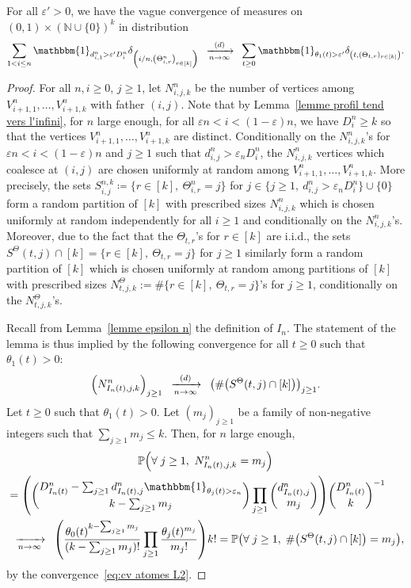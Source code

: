 \documentclass[AHL,Unicode,published]{cedram}
\newcommand{\e}{\varepsilon}
\newcommand{\cv}[1][n]{\enskip\xrightarrow[#1 \to \infty]{}\enskip}
\newcommand{\cvloi}[1][n]{\enskip\xrightarrow[#1 \to \infty]{(d)}\enskip}
\newcommand{\N}{\mathbb{N}}
\renewcommand{\P}{{\mathbb{P}}}
\newcommand{\1}{\mathbbm{1}}
\let\originalleft\left
\let\originalright\right
\renewcommand{\left}{\mathopen{}\mathclose\bgroup\originalleft}
\renewcommand{\right}{\aftergroup\egroup\originalright}
\renewcommand*{\to}{\mathchoice{\longrightarrow}{\rightarrow}{\rightarrow}{\rightarrow}}
\let\oldforall\forall
\renewcommand*{\forall}{\mathrel{\oldforall}}
\begin{document}
\begin{lemm}\label{lem: cv grandes coalescences}
For all $\e'>0$, we have the {vague} convergence of measures on $(0,1)\times (\N\cup \{0\})^k$ in distribution
\[
\sum_{1 < i \le n}
\1_{d^n_{i,1}>\e' D^n_i} \delta_{\left(i/n, \left(\Theta^n_{i,r}\right)_{r \in [k]}\right)}
\cvloi[n]
\sum_{t\ge 0} \1_{\theta_1(t)>\e'}\delta_{\left(t,(\Theta_{t,r})_{r \in [k]}\right)}.
\]
\end{lemm}
\begin{proof}
For all $n,i\ge 0$, $j\ge 1$, let $N^n_{i,j,k}$ be the number of vertices among $V^n_{i+1,1}, \dots, V^n_{i+1,k}$ with father $(i,j)$. Note that by Lemma~\ref{lemme profil tend vers l'infini}, for $n$ large enough, for all $\e n < i < (1- \e) n $, we have $D^n_i \ge k$ so that the vertices $V^n_{i+1,1}, \dots, V^n_{i+1,k}$ are distinct. Conditionally on the $N^n_{i,j,k}$'s for $\e n < i < (1- \e) n $ and $j\ge 1$ such that $d^n_{i,j}>\e_n D^n_i$, the $N^n_{i,j,k}$ vertices which coalesce at $(i,j)$ are chosen uniformly at random among $V^n_{i+1,1}, \dots, V^n_{i+1,k}$. More precisely, the sets $S^{n,k}_{i,j}\coloneqq \{ r \in [k], \ \Theta^n_{i,r} = j\}$ for $j \in \{j \ge 1, \ d^n_{i,j} > \e_n D^n_i \}\cup \{0\}$ form a random partition of $[k]$ with prescribed sizes $N^n_{i,j,k}$ which is chosen uniformly at random independently for all $i\ge 1$ and conditionally on the $N^n_{i,j,k}$'s. Moreover, due to the fact that the $\Theta_{t,r}$'s for $r\in [k]$ are i.i.d., the sets $S^\Theta(t,j) \cap [k]= \{r \in [k], \ \Theta_{t,r}=j \}$ for $j\ge 1$ similarly form a random partition of $[k]$ which is chosen uniformly at random among partitions of $[k]$ with prescribed sizes $N_{t,j,k}^\Theta:=\#\{r\in [k], \ \Theta_{t,r}= j \}$'s for $j\ge 1$, conditionally on the $N_{t,j,k}^\Theta$'s.

Recall from Lemma~\ref{lemme epsilon n} the definition of $I_n$. The statement of the lemma is thus implied by the following convergence for all $t\ge 0$ such that $\theta_1(t)>0$:
\begin{equation}\label{eq:convergence N_IJ}
\left(N^n_{I_n(t), j,k}
\right)_{j\ge 1}
\cvloi[n] \left(\# \left(S^\Theta(t,j) \cap [k]\right)\right)_{j\ge 1}.
\end{equation}
Let $t\ge 0$ such that $\theta_1(t)>0$. Let $(m_j)_{j\ge 1}$ be a family of non-negative integers such that $\sum_{j\ge 1} m_j \le k$. Then, for $n$ large enough,
\begin{multline*}
\P\left(
\forall j\ge 1,
\ N^n_{I_n(t),j,k} = m_j
\right) \\
\begin{aligned}
&=
\left({\binom{D^n_{I_n(t)}-\sum_{j\ge 1} d^n_{I_n(t), j}\1_{\theta_j(t)>\e_n}}{k-\sum_{j\ge 1} m_j}\prod_{j\ge 1} \binom{d^n_{I_n(t),j}}{m_j}}\right){\binom{D^n_{I_n(t)}}{k}}^{-1}
\\
&\cv[n] \left(
\frac{\theta_0(t)^{k-\sum_{j\ge 1} m_j}}{(k-\sum_{j\ge 1} m_j)!}
\prod_{j\ge 1} \frac{\theta_j(t)^{m_j}}{m_j!}
\right) {k!}=\P\left(
\forall j \ge 1, \; \# \left(S^\Theta(t,j) \cap [k]\right)= m_j
\right),
\end{aligned}
\end{multline*}
by the convergence~\eqref{eq:cv atomes L2}.
\end{proof}
\end{document}
